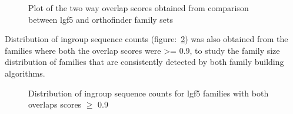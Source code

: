\documentclass{article}
\begin{document}
		\begin{figure}[h!]
			\caption{Plot of the two way overlap scores obtained from comparison between lgf5 and orthofinder family sets}
			\label{fig:scatter_lgf5_vs_orthofinder_overlap_lgf5}
		\end{figure}
		
		Distribution of ingroup sequence counts (figure:~\ref{fig:hist_seq_ct_lgf5_vs_orthofinder_90percent_overlap}) was also obtained from the families where both the overlap scores were >= 0.9, to study the family size distribution of families that are consistently detected by both family building algorithms. 
		\begin{figure}[h!]
			\caption{Distribution of ingroup sequence counts for lgf5 families with both overlaps scores $\geq$ 0.9 }
			\label{fig:hist_seq_ct_lgf5_vs_orthofinder_90percent_overlap}
		\end{figure}
		
\end{document}

